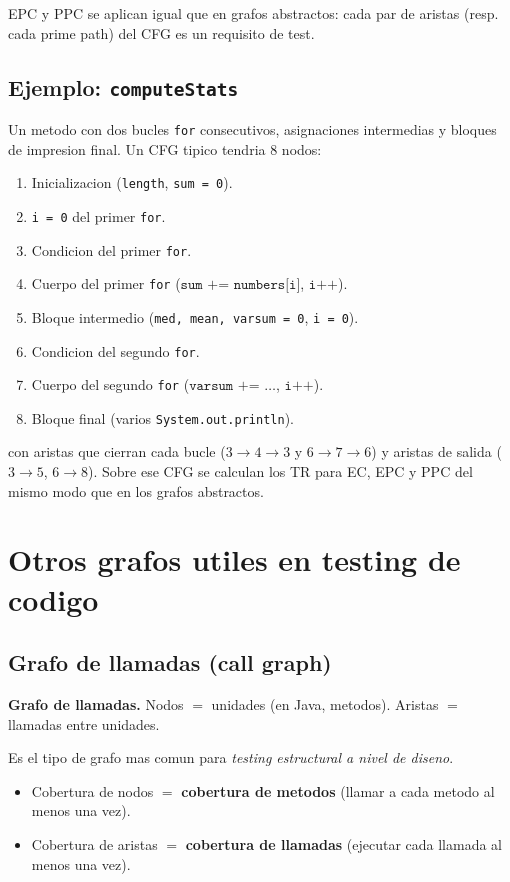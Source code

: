 \documentclass[12pt,a4paper]{article}
\begin{document}
EPC y PPC se aplican igual que en grafos abstractos: cada par de aristas (resp. cada prime path)
del CFG es un requisito de test.

\subsection{Ejemplo: \texttt{computeStats}}

Un metodo con dos bucles \texttt{for} consecutivos, asignaciones intermedias y bloques de
impresion final. Un CFG tipico tendria 8 nodos:
\begin{enumerate}
  \item Inicializacion (\texttt{length}, \texttt{sum = 0}).
  \item \texttt{i = 0} del primer \texttt{for}.
  \item Condicion del primer \texttt{for}.
  \item Cuerpo del primer \texttt{for} ($\texttt{sum += numbers[i]}$, $\texttt{i++}$).
  \item Bloque intermedio (\texttt{med, mean, varsum = 0}, \texttt{i = 0}).
  \item Condicion del segundo \texttt{for}.
  \item Cuerpo del segundo \texttt{for} ($\texttt{varsum += \ldots}$, $\texttt{i++}$).
  \item Bloque final (varios \texttt{System.out.println}).
\end{enumerate}
con aristas que cierran cada bucle ($3 \to 4 \to 3$ y $6 \to 7 \to 6$) y aristas de salida
($3 \to 5$, $6 \to 8$). Sobre ese CFG se calculan los TR para EC, EPC y PPC del mismo modo que en
los grafos abstractos.

\section{Otros grafos utiles en testing de codigo}

\subsection{Grafo de llamadas (call graph)}

\begin{definicionbox}
\textbf{Grafo de llamadas.} Nodos $=$ unidades (en Java, metodos). Aristas $=$ llamadas entre
unidades.
\end{definicionbox}

Es el tipo de grafo mas comun para \emph{testing estructural a nivel de diseno}.
\begin{itemize}
  \item Cobertura de nodos $=$ \textbf{cobertura de metodos} (llamar a cada metodo al menos una
  vez).
  \item Cobertura de aristas $=$ \textbf{cobertura de llamadas} (ejecutar cada llamada al menos
  una vez).
\end{itemize}
\end{document}
